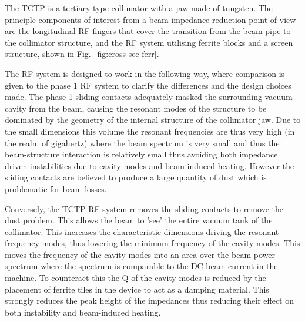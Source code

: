 The TCTP is a tertiary type collimator with a jaw made of tungsten. The principle components of interest from a beam impedance reduction point of view are the longitudinal RF fingers that cover the transition from the beam pipe to the collimator structure, and the RF system utilising ferrite blocks and a screen structure, shown in Fig.~\ref{fig:cross-sec-ferr}.

The RF system is designed to work in the following way, where comparison is given to the phase 1 RF system to clarify the differences and the design choices made. The phase 1 sliding contacts adequately masked the surrounding vacuum cavity from the beam, causing the resonant modes of the structure to be dominated by the geometry of the internal structure of the collimator jaw. Due to the small dimensions this volume the resonant frequencies are thus very high (in the realm of gigahertz) where the beam spectrum is very small and thus the beam-structure interaction is relatively small thus avoiding both impedance driven instabilities due to cavity modes and beam-induced heating. However the sliding contacts are believed to produce a large quantity of dust which is problematic for beam losses.

Conversely, the TCTP RF system removes the sliding contacts to remove the dust problem. This allows the beam to 'see' the entire vacuum tank of the collimator. This increases the characteristic dimensions driving the resonant frequency modes, thus lowering the minimum frequency of the cavity modes. This moves the frequency of the cavity modes into an area over the beam power spectrum where the spectrum is comparable to the DC beam current in the machine. To counteract this the Q of the cavity modes is reduced by the placement of ferrite tiles in the device to act as a damping material. This strongly reduces the peak height of the impedances thus reducing their effect on both instability and beam-induced heating.